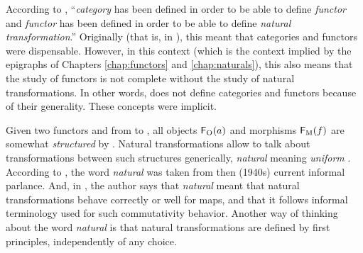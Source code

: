 \begin{remark}
  \label{re:category-functor-natural}

  According to \textcite[18]{maclane-1998}, ``\emph{category} has been
  defined in order to be able to define \emph{functor} and
  \emph{functor} has been defined in order to be able to define
  \emph{natural transformation}.'' Originally (that is, in
  \parencite{eilenberg-maclane-1942,eilenberg-maclane-1945}), this meant that categories
  and functors were dispensable. However, in this context (which is
  the context implied by the epigraphs of Chapters \ref{chap:functors}
  and \ref{chap:naturals}), this also means that the study of functors
  is not complete without the study of natural transformations. In
  other words, \parencite{eilenberg-maclane-1942} does not define categories and
  functors because of their generality. These concepts were implicit.

\end{remark}

\begin{remark}
  \label{re:natural}

  Given two functors  and  from  to ,
  all objects $\mathsf{F}_{\operatorname{O}}(a)$ and morphisms $\mathsf{F}_{\operatorname{M}}(f)$ are somewhat
  \emph{structured} by . Natural transformations allow to talk
  about transformations between such structures generically,
  \emph{natural} meaning \emph{uniform} \parencite[page
    77]{elkins-2009}. According to \parencite[page 30]{maclane-1998},
  the word \emph{natural} was taken from then (1940s) current informal
  parlance. And, in \parencite{maclane-2005}, the author says that
  \emph{natural} meant that natural transformations behave correctly
  or well for maps, and that it follows informal terminology used for
  such commutativity behavior. Another way of thinking about the word
  \emph{natural} is that natural transformations are defined by first
  principles, independently of any choice.

\end{remark}

